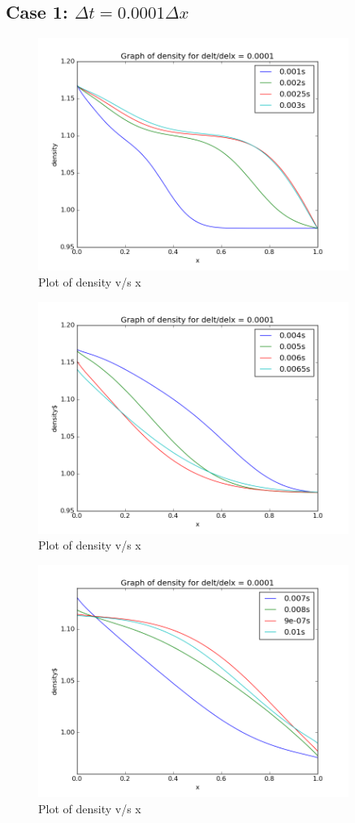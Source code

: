 \documentclass[11pt, a4paper]{article}
\begin{document}
\subsection{Case 1: $\Delta t = 0.0001 \Delta x$}
\begin{figure}[H]
 \centering
 \includegraphics[width = 0.9\textwidth]{lax_fed_1_1.png}
 \caption{Plot of density v/s x}
\end{figure}
\begin{figure}[H]
 \centering
 \includegraphics[width = 0.9\textwidth]{lax_fed_1_2.png}
 \caption{Plot of density v/s x}
\end{figure}
\begin{figure}[H]
 \centering
 \includegraphics[width = 0.9\textwidth]{lax_fed_1_3.png}
 \caption{Plot of density v/s x}
\end{figure}
\end{document}
